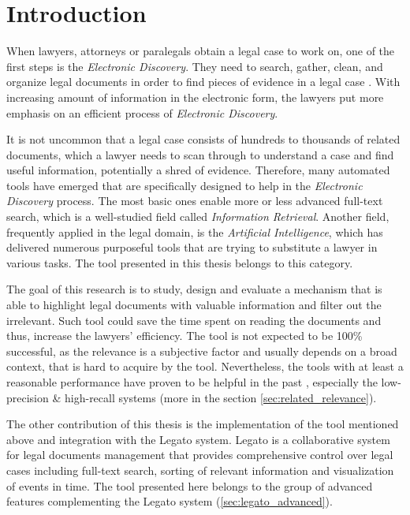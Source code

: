 \documentclass[
  digital, %
  notable,   %
  nolof,     %
  nolot,     %
]{fithesis3}
\begin{document}
\chapter*{Introduction}
When lawyers, attorneys or paralegals obtain a legal case to work on, one of the first steps is the \textit{Electronic Discovery}.
They need to search, gather, clean, and organize legal documents in order to find pieces of evidence in a legal case \cite{Conrad2010ediscovery}.
With increasing amount of information in the electronic form, the lawyers put more emphasis on an efficient process of \textit{Electronic Discovery}.

It is not uncommon that a legal case consists of hundreds to thousands of related documents, which a lawyer needs to scan through to understand a case and find useful information, potentially a shred of evidence.
Therefore, many automated tools have emerged that are specifically designed to help in the \textit{Electronic Discovery} process.
The most basic ones enable more or less advanced full-text search, which is a well-studied field called \textit{Information Retrieval}.
Another field, frequently applied in the legal domain, is the \textit{Artificial Intelligence}, which has delivered numerous purposeful tools that are trying to substitute a lawyer in various tasks.
The tool presented in this thesis belongs to this category.

The goal of this research is to study, design and evaluate a mechanism that is able to highlight legal documents with valuable information and filter out the irrelevant.
Such tool could save the time spent on reading the documents and thus, increase the lawyers' efficiency.
The tool is not expected to be 100\% successful, as the relevance is a subjective factor and usually depends on a broad context, that is hard to acquire by the tool.
Nevertheless, the tools with at least a reasonable performance have proven to be helpful in the past \cite{roitblat2010comparison}, especially the low-precision \& high-recall systems (more in the section \ref{sec:related_relevance}).

The other contribution of this thesis is the implementation of the tool mentioned above and integration with the Legato system. 
Legato is a collaborative system for legal documents management that provides comprehensive control over legal cases including full-text search, sorting of relevant information and visualization of events in time.
The tool presented here belongs to the group of advanced features complementing the Legato system (\ref{sec:legato_advanced}).
\end{document}
